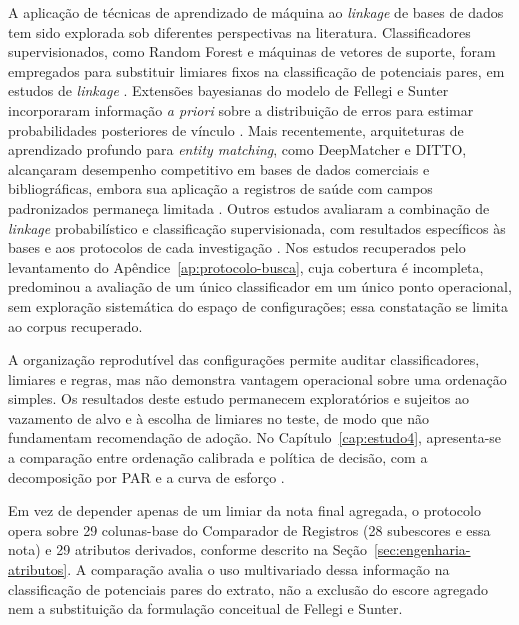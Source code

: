 A aplicação de técnicas de aprendizado de máquina ao \textit{linkage} de bases de dados tem sido explorada sob diferentes perspectivas na literatura. Classificadores supervisionados, como Random Forest e máquinas de vetores de suporte, foram empregados para substituir limiares fixos na classificação de potenciais pares, em estudos de \textit{linkage} \cite{Jiao2021hybrid,Rochner2024machine}. Extensões bayesianas do modelo de Fellegi e Sunter incorporaram informação \textit{a priori} sobre a distribuição de erros para estimar probabilidades posteriores de vínculo \cite{Enamorado2019fastlink}. Mais recentemente, arquiteturas de aprendizado profundo para \textit{entity matching}, como DeepMatcher e DITTO, alcançaram desempenho competitivo em bases de dados comerciais e bibliográficas, embora sua aplicação a registros de saúde com campos padronizados permaneça limitada \cite{Mudgal2018deepmatcher, Li2020ditto}. Outros estudos avaliaram a combinação de \textit{linkage} probabilístico e classificação supervisionada, com resultados específicos às bases e aos protocolos de cada investigação \cite{Jiao2021hybrid}. Nos estudos recuperados pelo levantamento do Apêndice~\ref{ap:protocolo-busca}, cuja cobertura é incompleta, predominou a avaliação de um único classificador em um único ponto operacional, sem exploração sistemática do espaço de configurações; essa constatação se limita ao corpus recuperado.

A organização reprodutível das configurações permite auditar classificadores, limiares e regras, mas não demonstra vantagem operacional sobre uma ordenação simples. Os resultados deste estudo permanecem exploratórios e sujeitos ao vazamento de alvo e à escolha de limiares no teste, de modo que não fundamentam recomendação de adoção. No Capítulo~\ref{cap:estudo4}, apresenta-se a comparação entre ordenação calibrada e política de decisão, com a decomposição por PAR e a curva de esforço \cite{Jardim2026phdrepo}.

Em vez de depender apenas de um limiar da nota final agregada, o protocolo opera sobre 29 colunas-base do Comparador de Registros \cite{Jardim2025comparador, Lucena2013algoritmos} (28 subescores e essa nota) e 29 atributos derivados, conforme descrito na Seção~\ref{sec:engenharia-atributos}. A comparação avalia o uso multivariado dessa informação na classificação de potenciais pares do extrato, não a exclusão do escore agregado nem a substituição da formulação conceitual de Fellegi e Sunter.


